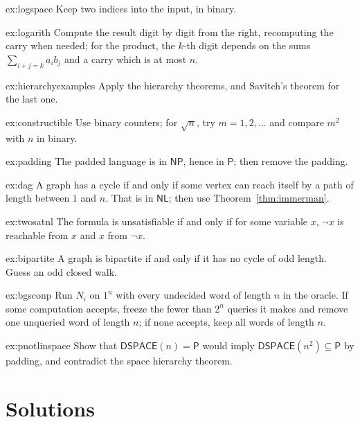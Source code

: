 \begin{hint}{ex:logspace}
Keep two indices into the input, in binary.
\end{hint}
\begin{hint}{ex:logarith}
Compute the result digit by digit from the right, recomputing the carry when needed; for the product, the $k$-th digit depends on the sums $\sum_{i+j=k}a_ib_j$ and a carry which is at most $n$.
\end{hint}
\begin{hint}{ex:hierarchyexamples}
Apply the hierarchy theorems, and Savitch's theorem for the last one.
\end{hint}
\begin{hint}{ex:constructible}
Use binary counters; for $\sqrt n$, try $m=1,2,\dots$ and compare $m^2$ with $n$ in binary.
\end{hint}
\begin{hint}{ex:padding}
The padded language is in $\mathsf{NP}$, hence in $\mathsf P$; then remove the padding.
\end{hint}
\begin{hint}{ex:dag}
A graph has a cycle if and only if some vertex can reach itself by a path of length between $1$ and $n$. That is in $\mathsf{NL}$; then use Theorem~\ref{thm:immerman}.
\end{hint}
\begin{hint}{ex:twosatnl}
The formula is unsatisfiable if and only if for some variable $x$, $\neg x$ is reachable from $x$ and $x$ from $\neg x$.
\end{hint}
\begin{hint}{ex:bipartite}
A graph is bipartite if and only if it has no cycle of odd length. Guess an odd closed walk.
\end{hint}
\begin{hint}{ex:bgsconp}
Run $N_i$ on $1^n$ with every undecided word of length $n$ in the oracle. If some computation accepts, freeze the fewer than $2^n$ queries it makes and remove one unqueried word of length $n$; if none accepts, keep all words of length $n$.
\end{hint}
\begin{hint}{ex:pnotlinspace}
Show that $\mathsf{DSPACE}(n)=\mathsf P$ would imply $\mathsf{DSPACE}(n^2)\subseteq\mathsf P$ by padding, and contradict the space hierarchy theorem.
\end{hint}

\section{Solutions}

